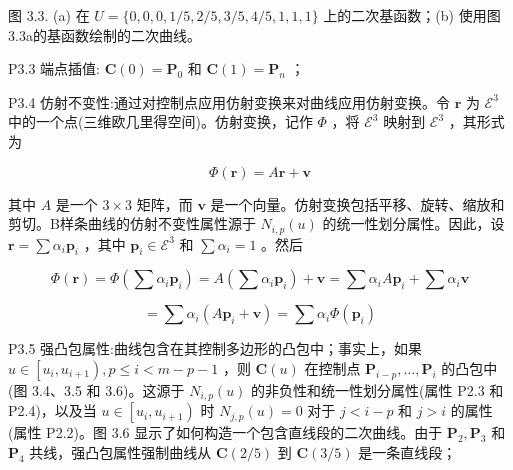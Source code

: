 \documentclass[../main.tex]{subfiles}
\begin{document}
\begin{center}
\begin{minipage}{18cm}
\vspace*{.6\baselineskip}
\centering
{}
\par\smallskip
图 3.3. (a) 在 \(U = \{ 0,0,0,1/5,2/5,3/5,4/5,1,1,1\}\) 上的二次基函数；(b) 使用图3.3a的基函数绘制的二次曲线。
\end{minipage}
\end{center}

P3.3 端点插值: \(\mathbf{C}\left( 0\right)  = {\mathbf{P}}_{0}\) 和 \(\mathbf{C}\left( 1\right)  = {\mathbf{P}}_{n}\) ；

P3.4 仿射不变性:通过对控制点应用仿射变换来对曲线应用仿射变换。令 \(\mathbf{r}\) 为 \({\mathcal{E}}^{3}\) 中的一个点(三维欧几里得空间)。仿射变换，记作 \(\Phi\) ，将 \({\mathcal{E}}^{3}\) 映射到 \({\mathcal{E}}^{3}\) ，其形式为

\[
\Phi \left( \mathbf{r}\right)  = A\mathbf{r} + \mathbf{v}
\]

其中 \(A\) 是一个 \(3 \times  3\) 矩阵，而 \(\mathbf{v}\) 是一个向量。仿射变换包括平移、旋转、缩放和剪切。B样条曲线的仿射不变性属性源于 \({N}_{i,p}\left( u\right)\) 的统一性划分属性。因此，设 \(\mathbf{r} = \sum {\alpha }_{i}{\mathbf{p}}_{i}\) ，其中 \({\mathbf{p}}_{i} \in  {\mathcal{E}}^{3}\) 和 \(\sum {\alpha }_{i} = 1\) 。然后

\[
\Phi \left( \mathbf{r}\right)  = \Phi \left( {\sum {\alpha }_{i}{\mathbf{p}}_{i}}\right)  = A\left( {\sum {\alpha }_{i}{\mathbf{p}}_{i}}\right)  + \mathbf{v} = \sum {\alpha }_{i}A{\mathbf{p}}_{i} + \sum {\alpha }_{i}\mathbf{v}
\]

\[
= \sum {\alpha }_{i}\left( {A{\mathbf{p}}_{i} + \mathbf{v}}\right)  = \sum {\alpha }_{i}\Phi \left( {\mathbf{p}}_{i}\right)
\]

P3.5 强凸包属性:曲线包含在其控制多边形的凸包中；事实上，如果 \(u \in  \left\lbrack  {{u}_{i},{u}_{i + 1}}\right) ,p \leq  i < m - p - 1\) ，则 \(\mathbf{C}\left( u\right)\) 在控制点 \({\mathbf{P}}_{i - p},\ldots ,{\mathbf{P}}_{i}\) 的凸包中(图 3.4、3.5 和 3.6)。这源于 \({N}_{i,p}\left( u\right)\) 的非负性和统一性划分属性(属性 P2.3 和 P2.4)，以及当 \(u \in  \left\lbrack  {{u}_{i},{u}_{i + 1}}\right)\) 时 \({N}_{j,p}\left( u\right)  = 0\) 对于 \(j < i - p\) 和 \(j > i\) 的属性(属性 P2.2)。图 3.6 显示了如何构造一个包含直线段的二次曲线。由于 \({\mathbf{P}}_{2},{\mathbf{P}}_{3}\) 和 \({\mathbf{P}}_{4}\) 共线，强凸包属性强制曲线从 \(\mathbf{C}\left( {2/5}\right)\) 到 \(\mathbf{C}\left( {3/5}\right)\) 是一条直线段；
\end{document}

